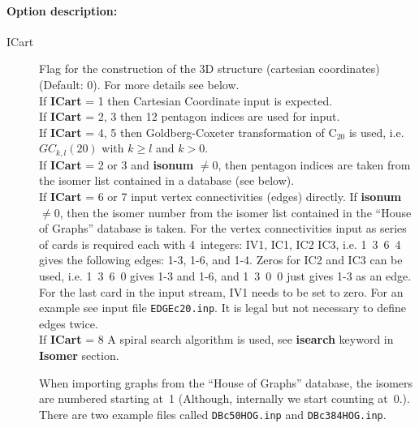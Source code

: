 \documentclass[article,a4paper,twoside]{memoir}
\newcommand{\C}[1]{\ensuremath{\mathrm{C}_{#1}}}
\newcommand{\filename}[1]{\texttt{#1}}
\newcommand{\paramname}[1]{{\color{green}\textbf{#1}}}
\begin{document}
\paragraph{Option description:} 
\begin{description}
\item[{ICart}] Flag for the construction of the 3D structure (cartesian coordinates) (Default: 0). For more details see below.\\
If \paramname{ICart} = 1 then Cartesian Coordinate input is expected.\\
If \paramname{ICart} = 2, 3 then 12 pentagon indices are used for input.\\
If \paramname{ICart} = 4, 5 then Goldberg-Coxeter transformation of \C{20} is used, i.e. $GC_{k,l}(20)$ with $k \geq l$ and $k > 0$.\\
If \paramname{ICart} = 2 or 3 and \paramname{isonum} $\neq 0$, then pentagon indices are taken from the
isomer list contained in a database (see below).\\
If \paramname{ICart} = 6 or 7 input vertex connectivities (edges) directly. If \paramname{isonum} $\neq 0$,
then the isomer number from the isomer list contained in the ``House of Graphs'' database is taken. For the
vertex connectivities input as series of cards is required each with 4~integers: IV1, IC1, IC2 IC3,
i.e. 1~3~6~4 gives the following edges: 1-3, 1-6, and 1-4.  Zeros for IC2 and IC3 can be used, i.e. 1~3~6~0
gives 1-3 and 1-6, and 1~3~0~0 just gives 1-3 as an edge.  For the last card in the input stream, IV1 needs
to be set to zero. For an example see input file \filename{EDGEc20.inp}.  It is legal but not necessary to define edges twice.\\
If \paramname{ICart} = 8 A spiral search algorithm is used, see \paramname{isearch} keyword in \paramname{Isomer} section.

When importing graphs from the ``House of Graphs'' database, the isomers are numbered starting at~1 (Although,
internally we start counting at~0.).  There are two example files called \filename{DBc50HOG.inp} and \filename{DBc384HOG.inp}.


\end{description}
\end{document}
